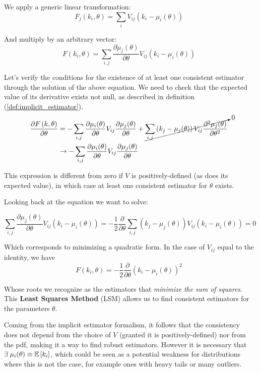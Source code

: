We apply a generic linear transformation:
	\[
	F_j\left(k_i,\theta\right) = \sum_i V_{ij}\left(k_i - \mu_i(\theta)\right)
	\]

And multiply by an arbitrary vector:
	\[
	F\left(k_i,\theta\right) = \sum_{i,j} \frac{\partial \mu_j(\theta)}{\partial\theta}V_{ij}\left(k_i - \mu_i(\theta)\right)
	\]

Let's verify the conditions for the existence of at least one consistent estimator through the solution of the above equation. We need to check that the expected value of its derivative exists not null, as described in definition (\ref{def:implicit_estimator}).
\begin{align*}
	\frac{\partial F\left(k,\theta\right)}{\partial\theta} &= -\sum_{i,j}\frac{\partial \mu_i(\theta)}{\partial\theta}V_{ij}\frac{\partial \mu_j(\theta)}{\partial\theta} + \cancelto{0}{\sum_{i,j}\left(k_j - \mu_j(\theta)\right)V_{ij}\frac{\partial^2 \mu_j(\theta)}{\partial\theta^2}}\\
	&\rightarrow -\sum_{i,j}\frac{\partial \mu_i(\theta)}{\partial\theta}V_{ij}\frac{\partial \mu_j(\theta)}{\partial\theta}
\end{align*}

This expression is different from zero if $V$ is positively-defined (as does its expected value), in which case at least one consistent estimator for $\theta$ exists. 

Looking back at the equation we want to solve: 

	\[
	\sum_{i,j} \frac{\partial \mu_j(\theta)}{\partial\theta}V_{ij}\left(k_i - \mu_i(\theta)\right) = -\frac{1}{2}\frac{\partial}{\partial\theta}\sum_{i,j} \left(k_j - \mu_j(\theta)\right)V_{ij}\left(k_i - \mu_i(\theta)\right) = 0
	\]

Which corresponds to minimizing a quadratic form. In the case of $V_{ij}$ equal to the identity, we have
	\[
	F(k_i,\theta) = - \frac{1}{2}\frac{\partial}{\partial\theta}\left(k_i-\mu_i(\theta)\right)^2
	\]

Whose roots we recognize as the estimators that \emph{minimize the sum of squares}. This \textbf{Least Squares Method} (LSM) allows us to find consistent estimators for the parameters $\theta$. 

Coming from the implicit estimator formalism, it follows that the consistency does not depend from the choice of $V$ (granted it is positively-defined) nor from the pdf, making it a way to find robust estimators. However it is necessary that $\exists\; \mu_i(\theta)\equiv \mathbb{E}\left[k_i\right]$, which could be seen as a potential weakness for distributions where this is not the case, for example ones with heavy tails or many outliers.

